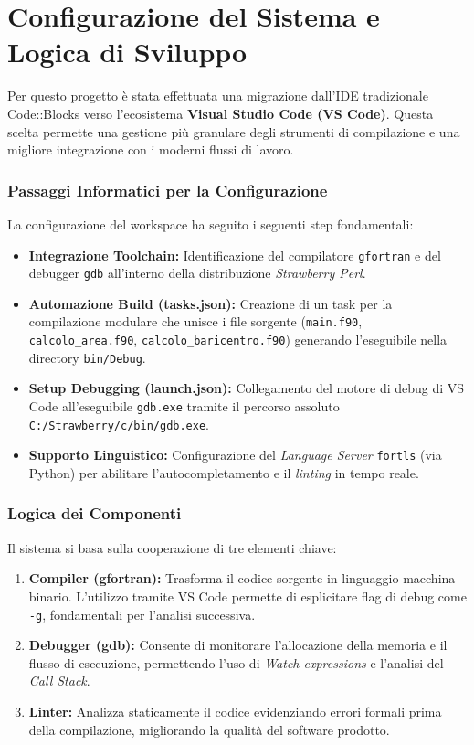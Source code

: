\chapter{Configurazione del Sistema e Logica di Sviluppo}

Per questo progetto è stata effettuata una migrazione dall'IDE tradizionale Code::Blocks verso l'ecosistema \textbf{Visual Studio Code (VS Code)}. Questa scelta permette una gestione più granulare degli strumenti di compilazione e una migliore integrazione con i moderni flussi di lavoro.

\subsection{Passaggi Informatici per la Configurazione}
La configurazione del workspace ha seguito i seguenti step fondamentali:
\begin{itemize}
    \item \textbf{Integrazione Toolchain:} Identificazione del compilatore \texttt{gfortran} e del debugger \texttt{gdb} all'interno della distribuzione \textit{Strawberry Perl}.
    \item \textbf{Automazione Build (tasks.json):} Creazione di un task per la compilazione modulare che unisce i file sorgente (\texttt{main.f90}, \texttt{calcolo\_area.f90}, \texttt{calcolo\_baricentro.f90}) generando l'eseguibile nella directory \texttt{bin/Debug}.
    \item \textbf{Setup Debugging (launch.json):} Collegamento del motore di debug di VS Code all'eseguibile \texttt{gdb.exe} tramite il percorso assoluto \texttt{C:/Strawberry/c/bin/gdb.exe}.
    \item \textbf{Supporto Linguistico:} Configurazione del \textit{Language Server} \texttt{fortls} (via Python) per abilitare l'autocompletamento e il \textit{linting} in tempo reale.
\end{itemize}

\subsection{Logica dei Componenti}
Il sistema si basa sulla cooperazione di tre elementi chiave:
\begin{enumerate}
    \item \textbf{Compiler (gfortran):} Trasforma il codice sorgente in linguaggio macchina binario. L'utilizzo tramite VS Code permette di esplicitare flag di debug come \texttt{-g}, fondamentali per l'analisi successiva.
    \item \textbf{Debugger (gdb):} Consente di monitorare l'allocazione della memoria e il flusso di esecuzione, permettendo l'uso di \textit{Watch expressions} e l'analisi del \textit{Call Stack}.
    \item \textbf{Linter:} Analizza staticamente il codice evidenziando errori formali prima della compilazione, migliorando la qualità del software prodotto.
\end{enumerate}

